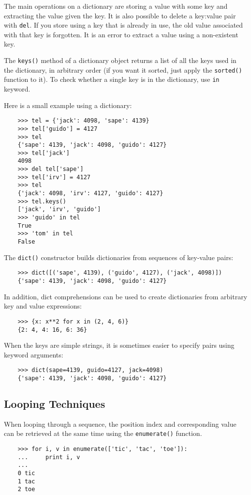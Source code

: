 \documentclass[UTF8]{article}
\begin{document}
The main operations on a dictionary are storing a value with some key and extracting the value
given the key. It is also possible to delete a key:value pair with \texttt{del}. If you store using
a key that is already in use, the old value associated with that key is forgotten. It is an error
to extract a value using a non-existent key.

The \texttt{keys()} method of a dictionary object returns a list of all the keys used in the
dictionary, in arbitrary order (if you want it sorted, just apply the \texttt{sorted()} function to
it). To check whether a single key is in the dictionary, use \texttt{in} keyword.

Here is a small example using a dictionary:
\begin{verbatim}
    >>> tel = {'jack': 4098, 'sape': 4139}
    >>> tel['guido'] = 4127
    >>> tel
    {'sape': 4139, 'jack': 4098, 'guido': 4127}
    >>> tel['jack']
    4098
    >>> del tel['sape']
    >>> tel['irv'] = 4127
    >>> tel
    {'jack': 4098, 'irv': 4127, 'guido': 4127}
    >>> tel.keys()
    ['jack', 'irv', 'guido']
    >>> 'guido' in tel
    True
    >>> 'tom' in tel
    False
\end{verbatim}

The \texttt{dict()} constructor builds dictionaries from sequences of key-value pairs:
\begin{verbatim}
    >>> dict([('sape', 4139), ('guido', 4127), ('jack', 4098)])
    {'sape': 4139, 'jack': 4098, 'guido': 4127}
\end{verbatim}

In addition, dict comprehensions can be used to create dictionaries from arbitrary key and value
expressions:
\begin{verbatim}
    >>> {x: x**2 for x in (2, 4, 6)}
    {2: 4, 4: 16, 6: 36}
\end{verbatim}

When the keys are simple strings, it is sometimes easier to specify pairs using keyword arguments:
\begin{verbatim}
    >>> dict(sape=4139, guido=4127, jack=4098)
    {'sape': 4139, 'jack': 4098, 'guido': 4127}
\end{verbatim}

\subsection{Looping Techniques}
When looping through a sequence, the position index and corresponding value can be retrieved at the
same time using the \texttt{enumerate()} function.
\begin{verbatim}
    >>> for i, v in enumerate(['tic', 'tac', 'toe']):
    ...     print i, v
    ...
    0 tic
    1 tac
    2 toe
\end{verbatim}
\end{document}
